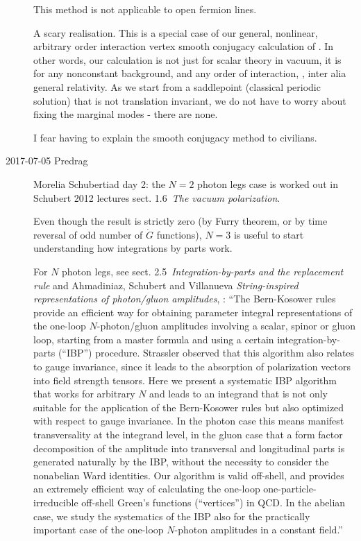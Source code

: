 \begin{description}
This method is not applicable to open
fermion lines.

A scary realisation. This is a special case of our general, nonlinear,
arbitrary order interaction vertex smooth conjugacy calculation of
. In other words, our calculation is not just for
scalar theory in vacuum, it is for any nonconstant background, and any
order of interaction, \ie, inter alia general relativity. As we start from
a saddlepoint (classical periodic solution) that is not translation
invariant, we do not have to worry about fixing the marginal modes -
there are none.

I fear having to explain the smooth conjugacy method to civilians.

\item[2017-07-05 Predrag] Morelia Schubertiad day 2:
the $N=2$ photon legs case is worked out in Schubert 2012
lectures sect. 1.6~{\em The vacuum polarization}.

Even though the result is strictly zero (by Furry theorem, or by time
reversal of odd number of $\dot{G}$ functions),
$N=3$ is useful to start understanding how integrations by parts work.

For $N$ photon legs, see sect. 2.5~{\em Integration-by-parts and the
replacement rule} and Ahmadiniaz, Schubert and Villanueva
{\em String-inspired representations of photon/gluon amplitudes},
:
``The Bern-Kosower rules provide an efficient way for obtaining parameter
integral representations of the one-loop $N$-photon/gluon amplitudes
involving a scalar, spinor or gluon loop, starting from a master formula
and using a certain integration-by-parts (``IBP'') procedure. Strassler
observed that this algorithm also relates to gauge invariance, since it
leads to the absorption of polarization vectors into field strength
tensors. Here we present a systematic IBP algorithm that works for
arbitrary $N$ and leads to an integrand that is not only suitable for the
application of the Bern-Kosower rules but also optimized with respect to
gauge invariance. In the photon case this means manifest transversality
at the integrand level, in the gluon case that a form factor
decomposition of the amplitude into transversal and longitudinal parts is
generated naturally by the IBP, without the necessity to consider the
nonabelian Ward identities. Our algorithm is valid off-shell, and
provides an extremely efficient way of calculating the one-loop
one-particle-irreducible off-shell Green's functions (``vertices'') in
QCD. In the abelian case, we study the systematics of the IBP also for
the practically important case of the one-loop $N$-photon amplitudes in a
constant field.''


\end{description}
